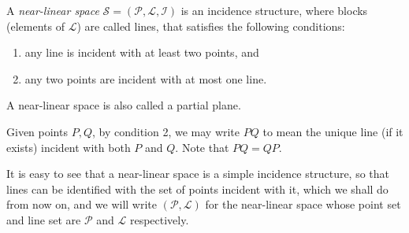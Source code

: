 \documentclass[12pt]{article}
\begin{document}
A {\em near-linear space} $\mathscr{S}=(\mathcal{P},\mathcal{L},\mathcal{I})$ is an incidence structure, where blocks (elements of $\mathcal{L}$) are called lines, that satisfies the following conditions:
\begin{enumerate}
\item any line is incident with at least two points, and
\item any two points are incident with at most one line.
\end{enumerate}
A near-linear space is also called a partial plane.

Given points $P,Q$, by condition 2, we may write $PQ$ to mean the unique line (if it exists) incident with both $P$ and $Q$.  Note that $PQ=QP$.

It is easy to see that a near-linear space is a simple incidence structure, so that lines can be identified with the set of points incident with it, which we shall do from now on, and we will write $(\mathcal{P},\mathcal{L})$ for the near-linear space whose point set and line set are $\mathcal{P}$ and $\mathcal{L}$ respectively.
\end{document}
